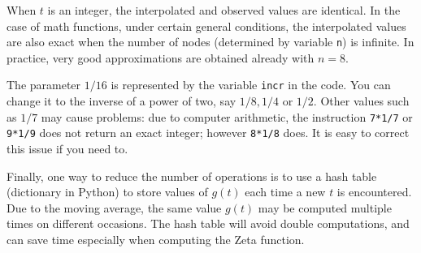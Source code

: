 \documentclass[oneside,10pt]{book}
\begin{document}
When $t$ is an integer, the interpolated and observed values are identical. In the case of math functions, under certain general conditions, the interpolated values are also exact when the number of nodes (determined by variable \texttt{n}) is infinite. In practice, very good approximations are obtained already with $n=8$.

The parameter $1/16$ is represented by the variable \texttt{incr} in the code. You can change it to the inverse of a power of two, say $1/8, 1/4$ or $1/2$. Other values
 such as $1/7$ may cause problems: due to computer arithmetic, the instruction \texttt{7*1/7} or \texttt{9*1/9} does not return an exact integer; however \texttt{8*1/8} does. It is
 easy to  correct this issue if you need to.

Finally, one way to reduce the number of operations is to use a hash table (dictionary in Python) to store values of $g(t)$ each time a new $t$ is encountered. Due to the moving average, the same value $g(t)$ may be computed multiple times on different occasions. The hash table will avoid double computations, and can save
 time especially when computing the Zeta function. \vspace{1ex}
\end{document}
